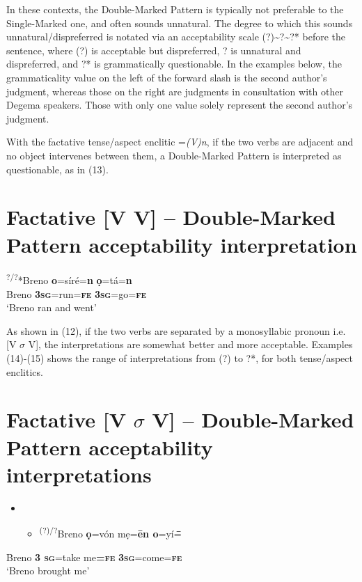 \documentclass[output=paper]{langsci/langscibook}
\begin{document}
In these contexts, the Double-Marked Pattern is typically not preferable to the Single-Marked one, and often sounds unnatural. The degree to which this sounds unnatural/dispreferred is notated via an acceptability scale (?){\textasciitilde}?{\textasciitilde}?* before the sentence, where (?) is acceptable but dispreferred, ? is unnatural and dispreferred, and ?* is grammatically questionable. In the examples below, the grammaticality value on the left of the forward slash is the second author’s judgment, whereas those on the right are judgments in consultation with other Degema speakers. Those with only one value solely represent the second author’s judgment.

With the factative tense/aspect enclitic =\textit{(V)n}, if the two verbs are adjacent and no object intervenes between them, a Double-Marked Pattern is interpreted as questionable, as in (13). 

\chapter[Factative [V V{]} – Double{}-Marked Pattern acceptability interpretation]{Factative [V V] – Double-Marked Pattern acceptability interpretation}
\label{bkm:Ref448214686}\gll \textsuperscript{?/?}*Breno   \textbf{o}=síré=\textbf{n}     \textbf{ọ}=tá=\textbf{n}\\
     Breno  \textbf{\textsc{3sg}}=run=\textbf{\textsc{fe  }}  \textbf{\textsc{3sg}}=go=\textbf{\textsc{fe}}\\
\glt ‘Breno ran and went’
\z

As shown in (12), if the two verbs are separated by a monosyllabic pronoun i.e. [V $\sigma $ V], the interpretations are somewhat better and more acceptable. Examples (14){}-(15) shows the range of interpretations from (?) to ?*, for both tense/aspect enclitics.

\chapter[Factative [V $\sigma $ V{]} – Double{}-Marked Pattern acceptability interpretations ]{Factative [V $\sigma $ V] – Double-Marked Pattern acceptability interpretations }
\label{bkm:Ref448215151}\begin{itemize}
\item \setcounter{itemize}{0}
\begin{itemize}
\item \gll \textsuperscript{   (?)/?}Breno  \textbf{ọ}=vón  mẹ=\textbf{\=en  o}=yí=\textbf{\=\in}\\
\end{itemize}
\end{itemize}
         Breno  \textbf{\textsc{3  sg}}=take  me\textbf{=}\textbf{\textsc{fe}}\textbf{  }\textbf{\textsc{3sg}}=come=\textbf{\textsc{fe}}\\
\glt ‘Breno brought me’
\z
\end{document}
